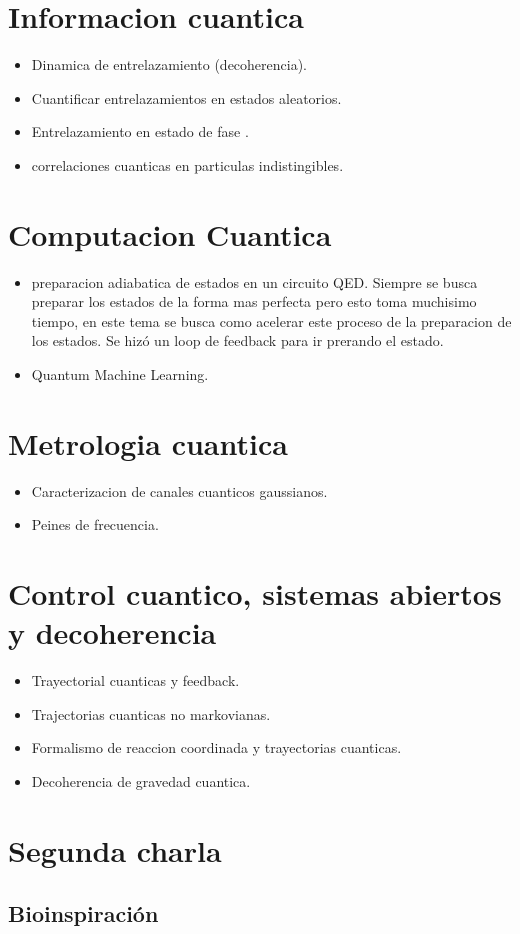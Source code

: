 \documentclass{article}
\begin{document}
\section{Informacion cuantica }
\begin{itemize}
  \item Dinamica de entrelazamiento (decoherencia). 
  \item Cuantificar entrelazamientos en estados aleatorios. 
  \item Entrelazamiento en estado de fase . 
  \item correlaciones cuanticas en particulas indistingibles. 
\end{itemize}

\section{Computacion Cuantica }
\begin{itemize}
  \item preparacion adiabatica de estados en un circuito QED. Siempre se busca preparar los estados de la forma mas perfecta pero esto toma muchisimo tiempo, en este tema se busca como acelerar este proceso de la preparacion de los estados. Se hizó un loop de feedback para ir prerando el estado. 
  \item Quantum Machine Learning. 
\end{itemize}

\section{Metrologia cuantica }
\begin{itemize}
  \item Caracterizacion de canales cuanticos gaussianos. 
  \item Peines de frecuencia. 
\end{itemize}

\section{Control cuantico, sistemas abiertos y decoherencia }
\begin{itemize}
  \item Trayectorial cuanticas y feedback. 
  \item Trajectorias cuanticas no markovianas. 
  \item Formalismo de reaccion coordinada y trayectorias cuanticas. 
  \item Decoherencia de gravedad cuantica. 
\end{itemize}

\section{Segunda charla }
\subsection{Bioinspiración }
\end{document}
